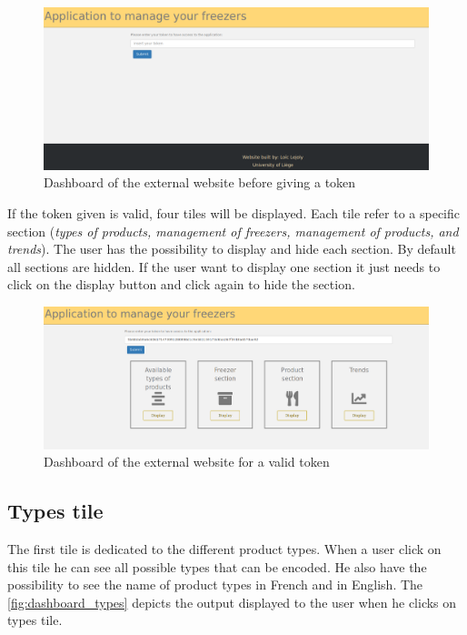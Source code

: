 \begin{figure}[H]
\centering
\includegraphics[scale=0.25]{./images/dashboard1.png}
\caption{Dashboard of the external website before giving a token}
\label{fig:dashboard1}
\end{figure}

If the token given is valid, four tiles will be displayed. Each tile refer to a specific section (\textit{types of products, management of freezers, management of products, and trends}). The user has the possibility to display and hide each section. By default all sections are hidden. If the user want to display one section it just needs to click on the display button and click again to hide the section.

\begin{figure}[H]
\centering
\includegraphics[scale=0.25]{./images/dashboard2.png}
\caption{Dashboard of the external website for a valid token}
\label{fig:dashboard2}
\end{figure}

\subsection{Types tile}
The first tile is dedicated to the different product types. When a user click on this tile he can see all possible types that can be encoded. He also have the possibility to see the name of product types in French and in English.
The \autoref{fig:dashboard_types} depicts the output displayed to the user when he clicks on types tile.

